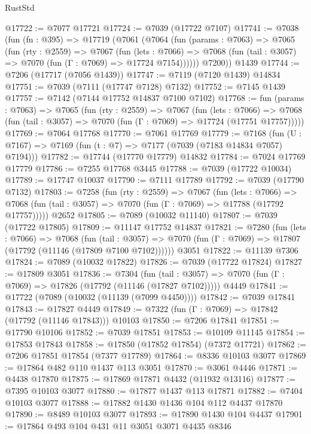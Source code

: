 \begin{lexlean}{RustStd}
\begin{coremodule}
@17722 := @7077 @17721
@17724 := @7039 (@17722 @7107)
@17741 := @7038
    (fun (fn : @395) =>
    @17719
      (@7061
        (@7064
          (fun (params : @7063) =>
          @7065
            (fun (rty : @2559) =>
            @7067
              (fun (lets : @7066) =>
              @7068 (fun (tail : @3057) => @7070 (fun (Γ : @7069) => @17724 @7154))))))
        @7200))
    @1439
@17744 := @7206 (@17717 (@7056 @1439))
@17747 := @7119 (@7120 @1439) @14834
@17751 := @7039 (@7111 (@17747 @7128) @7132)
@17752 := @7145 @1439
@17757 := @7142 (@7144 @17752 @14837 @7100 @7102)
@17768 := fun (params : @7063) =>
  @7065
    (fun (rty : @2559) =>
    @7067
      (fun (lets : @7066) =>
      @7068 (fun (tail : @3057) => @7070 (fun (Γ : @7069) => @17724 (@17751 @17757)))))
@17769 := @7064 @17768
@17770 := @7061 @17769
@17779 := @7168
    (fun (U : @7167) => @7169 (fun (t : @7) => @7177 (@7039 (@7183 @14834 @7057) @7194)))
@17782 := @17744 (@17770 @17779) @14832
@17784 := @7024 @17769 @17779
@17786 := @7255 @17768 @3445
@17788 := @7039 (@17722 @10034)
@17789 := @17747 @10037
@17790 := @7111 @17789
@17792 := @7039 (@17790 @7132)
@17803 := @7258
    (fun (rty : @2559) =>
    @7067
      (fun (lets : @7066) =>
      @7068 (fun (tail : @3057) => @7070 (fun (Γ : @7069) => @17788 (@17792 @17757)))))
    @2652
@17805 := @7089 (@10032 @11140)
@17807 := @7039 (@17722 @17805)
@17809 := @11147 @17752 @14837
@17821 := @7280
    (fun (lets : @7066) =>
    @7068
      (fun (tail : @3057) =>
      @7070 (fun (Γ : @7069) => @17807 (@17792 (@11146 (@17809 @7100 @7102))))))
    @3051
@17822 := @11139 @7306
@17824 := @7089 (@10032 @17822)
@17826 := @7039 (@17722 @17824)
@17827 := @17809 @3051
@17836 := @7304
    (fun (tail : @3057) => @7070 (fun (Γ : @7069) => @17826 (@17792 (@11146 (@17827 @7102)))))
    @4449
@17841 := @17722 (@7089 (@10032 (@11139 (@7099 @4450))))
@17842 := @7039 @17841
@17843 := @17827 @4449
@17849 := @7322 (fun (Γ : @7069) => @17842 (@17792 (@11146 @17843))) @10103
@17850 := @7206 @17841
@17851 := @17790 @10106
@17852 := @7039 @17851
@17853 := @10109 @11145
@17854 := @17853 @17843
@17858 := @17850 (@17852 @17854) (@7372 @17721)
@17862 := @7206 @17851 @17854 (@7377 @17789)
@17864 := @8336 @10103 @3077
@17869 := @17864 @482 @110 @1437 @113 @3051
@17870 := @3061 @4446
@17871 := @4438 @17870
@17875 := @17869 @17871 @4432 (@11932 @13116)
@17877 := @7395 @10103 @3077
@17880 := @17877 @1437 @113 @17871
@17882 := @7404 @10103 @3077
@17888 := @17882 @1430 @1436 @104 @112 @4437 @17870
@17890 := @8489 @10103 @3077
@17893 := @17890 @1430 @104 @4437
@17901 := @17864 @493 @104 @431 @11 @3051 @3071 @4435 @8346

\end{coremodule}
\end{lexlean}
